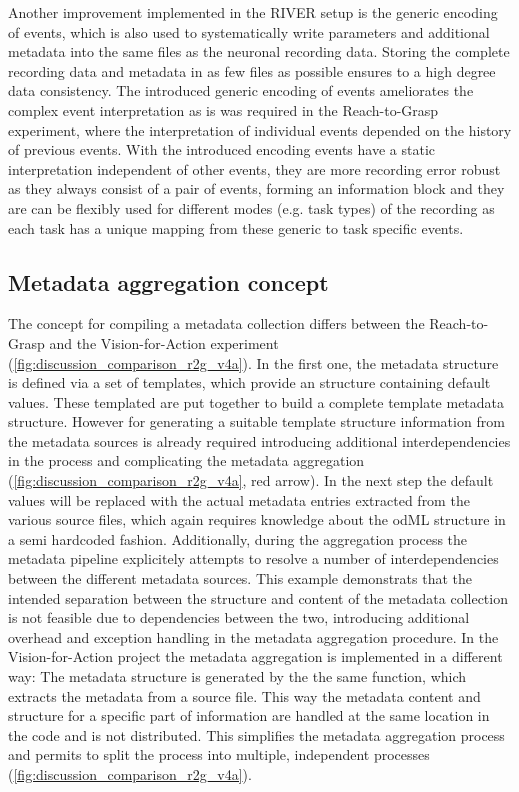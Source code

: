 Another improvement implemented in the RIVER setup is the generic encoding of events, which is also used to systematically write parameters and additional metadata into the same files as the neuronal recording data. Storing the complete recording data and metadata in as few files as possible ensures to a high degree data consistency. The introduced generic encoding of events ameliorates the complex event interpretation as is was required in the Reach-to-Grasp experiment, where the interpretation of individual events depended on the history of previous events. With the introduced encoding events have a static interpretation independent of other events, they are more recording error robust as they always consist of a pair of events, forming an information block and they are can be flexibly used for different modes (e.g. task types) of the recording as each task has a unique mapping from these generic to task specific events.

\subsection{Metadata aggregation concept}
\label{sec:disscussion_metadata_concept}
The concept for compiling a metadata collection differs between the Reach-to-Grasp and the Vision-for-Action experiment (\cref{fig:discussion_comparison_r2g_v4a}). In the first one, the metadata structure is defined via a set of templates, which provide an  structure containing default values. These templated are put together to build a complete template metadata structure. However for generating a suitable template structure information from the metadata sources is already required introducing additional interdependencies in the process and complicating the metadata aggregation (\cref{fig:discussion_comparison_r2g_v4a}, red arrow). In the next step the default values will be replaced with the actual metadata entries extracted from the various source files, which again requires knowledge about the odML structure in a semi hardcoded fashion. Additionally, during the aggregation process the metadata pipeline explicitely attempts to resolve a number of interdependencies between the different metadata sources. This example demonstrats that the intended separation between the structure and content of the metadata collection is not feasible due to dependencies between the two, introducing additional overhead and exception handling in the metadata aggregation procedure.
In the Vision-for-Action project the metadata aggregation is implemented in a different way: The metadata structure is generated by the the same function, which extracts the metadata from a source file. This way the metadata content and structure for a specific part of information are handled at the same location in the code and is not distributed. This simplifies the metadata aggregation process and permits to split the process into multiple, independent processes (\cref{fig:discussion_comparison_r2g_v4a}).

